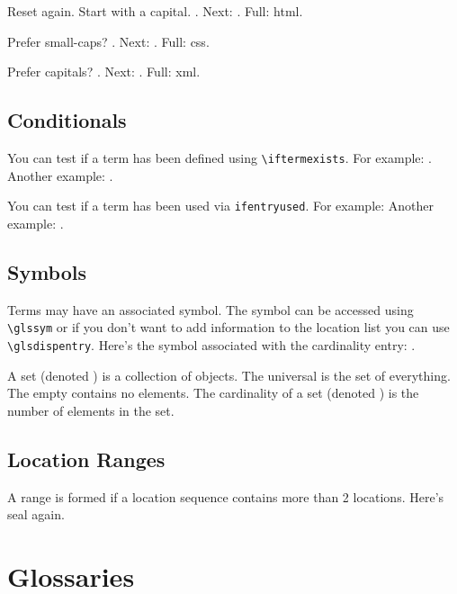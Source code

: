 \documentclass{book}
\begin{document}
Reset again. %
Start with a capital. .
Next: . Full: \Gls{html}.

Prefer small-caps?
\renewcommand{\acronymfont}[1]{\textsc{#1}}%
. Next: . Full: \gls{css}.

Prefer capitals?
\renewcommand{\acronymfont}[1]{\MakeUppercase{#1}}%
. Next: . Full: \gls{xml}.

\section{Conditionals}

You can test if a term has been defined using \verb|\iftermexists|.
For example: .
Another example: .

You can test if a term has been used via \verb|ifentryused|.
For example: 
Another example: .


\section{Symbols}

Terms may have an associated symbol. The symbol can be accessed
using \verb|\glssym| or if you don't want to add information to the
location list you can use \verb|\glsdispentry|. Here's the symbol
associated with the \gls{cardinality} entry:
.

A \gls{set} (denoted ) is a collection of objects.
The \gls{universal} is the set of everything.
The \gls{empty} contains no elements.
The \gls{cardinality} of a set (denoted ) is the
number of elements in the set.

\section{Location Ranges}

A range is formed if a location sequence contains more than 2
locations. Here's \gls{seal} again.

\backmatter
\setcounter{secnumdepth}{-1}

\chapter{Glossaries}
\end{document}

